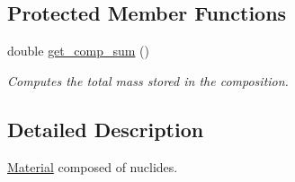 \subsection*{Protected Member Functions}
\begin{DoxyCompactItemize}
\item 
\hypertarget{classpyne_1_1_material_a6bfe2556962da33cc05eb1e88bdebf42}{double \hyperlink{classpyne_1_1_material_a6bfe2556962da33cc05eb1e88bdebf42}{get\+\_\+comp\+\_\+sum} ()}\label{classpyne_1_1_material_a6bfe2556962da33cc05eb1e88bdebf42}

\begin{DoxyCompactList}\small\item\em Computes the total mass stored in the composition. \end{DoxyCompactList}\end{DoxyCompactItemize}


\subsection{Detailed Description}
\hyperlink{classpyne_1_1_material}{Material} composed of nuclides. 

